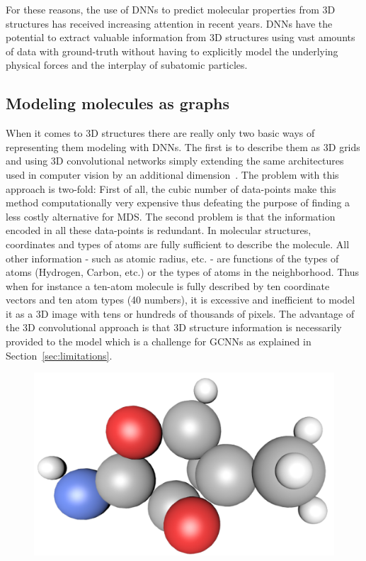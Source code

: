 For these reasons, the use of DNNs to predict molecular properties from 3D structures has received increasing attention in recent years. DNNs have the potential to extract valuable information from 3D structures using vast amounts of data with ground-truth without having to explicitly model the underlying physical forces and the interplay of subatomic particles.

\subsection{Modeling molecules as graphs}
\label{sec:molecules-as-graphs}

When it comes to 3D structures there are really only two basic ways of representing them modeling with DNNs. The first is to describe them as 3D grids and using 3D convolutional networks simply extending the same architectures used in computer vision by an additional dimension~\cite{Wallach2015}. The problem with this approach is two-fold: First of all, the cubic number of data-points make this method computationally very expensive thus defeating the purpose of finding a less costly alternative for MDS. The second problem is that the information encoded in all these data-points is redundant. In molecular structures, coordinates and types of atoms are fully sufficient to describe the molecule. All other information - such as atomic radius, etc. - are functions of the types of atoms (Hydrogen, Carbon, etc.) or the types of atoms in the neighborhood. Thus when for instance a ten-atom molecule is fully described by ten coordinate vectors and ten atom types (40 numbers), it is excessive and inefficient to model it as a 3D image with tens or hundreds of thousands of pixels. The advantage of the 3D convolutional approach is that 3D structure information is necessarily provided to the model which is a challenge for GCNNs as explained in Section~\ref{sec:limitations}.

\begin{figure}[H]
	\centering
	\includegraphics[width=\linewidth]{figures/molecule-3d-1}
	\caption{
	}
	\label{fig:molecule-3d}
\end{figure}

